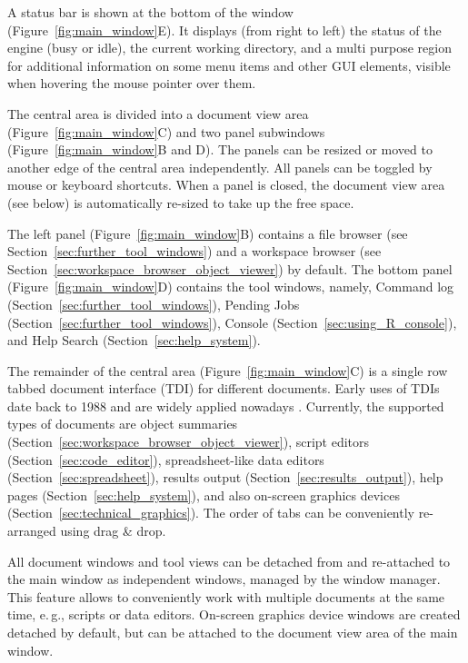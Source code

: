 A status bar is shown at the bottom of the window (Figure~\ref{fig:main_window}E). It displays (from
right to left) the status of the  engine (busy or idle), the
current working directory, and a multi purpose region for additional
information on some menu items and other GUI elements, visible when
hovering the mouse pointer over them.

The central area is divided into a document view area
(Figure~\ref{fig:main_window}C) and two panel subwindows
(Figure~\ref{fig:main_window}B and D). The panels can be resized or moved to
another edge of the central area independently. All panels can be
toggled by mouse or keyboard shortcuts. When a panel is closed, the
document view area (see below) is automatically re-sized to take up the
free space.

The left panel (Figure~\ref{fig:main_window}B) contains a file browser (see Section~\ref{sec:further_tool_windows}) and a
workspace browser (see Section~\ref{sec:workspace_browser_object_viewer}) by default. The
bottom panel (Figure~\ref{fig:main_window}D) contains the tool windows, namely, Command
log (Section~\ref{sec:further_tool_windows}), Pending Jobs (Section~\ref{sec:further_tool_windows}),  Console
(Section~\ref{sec:using_R_console}), and Help Search (Section~\ref{sec:help_system}).

The remainder of the central area (Figure~\ref{fig:main_window}C) is a single row tabbed document
interface (TDI) for different documents. Early uses of TDIs date back to 1988 and are
widely applied nowadays \citep{Hopkins2005, MDN2010,
KimLutteroth2010}. Currently, the supported types of
documents are object summaries (Section~\ref{sec:workspace_browser_object_viewer}), 
script editors (Section~\ref{sec:code_editor}), spreadsheet-like data editors 
(Section~\ref{sec:spreadsheet}), results output (Section~\ref{sec:results_output}), 
help pages (Section~\ref{sec:help_system}), and also
 on-screen graphics devices (Section~\ref{sec:technical_graphics}). 
The order of tabs can be conveniently re-arranged
using drag \& drop.

All document windows and tool views can be detached from and re-attached to the main
window as independent windows, managed by the window manager. This feature allows to 
conveniently work with multiple documents
at the same time, e.\,g., scripts or data editors. On{}-screen
graphics device windows are created detached by default, but can 
be attached to the document view area of the main window.

